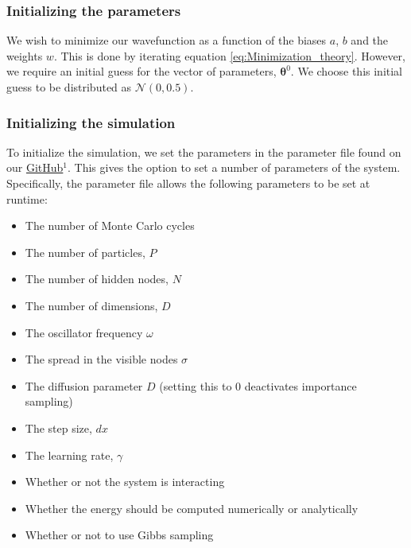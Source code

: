 \documentclass[a4paper, 10pt]{article}
\begin{document}
	\subsubsection{Initializing the parameters}
	We wish to minimize our wavefunction as a function of the biases $a$, $b$ and  the weights $w$. This is done by iterating equation \ref{eq:Minimization_theory}. However, we require an initial guess for the vector of parameters, $\boldsymbol{\theta}^0$. We choose this initial guess to be distributed as $\mathcal{N}(0, 0.5)$.
	\subsubsection{Initializing the simulation}
	To initialize the simulation, we set the parameters in the parameter file found on our \href{https://github.com/dulte/FYS4411/tree/master/Project2}{GitHub}$^1$. This gives the option to set a number of parameters of the system. Specifically, the parameter file allows the following parameters to be set at runtime:
	\begin{itemize}
	\item The number of Monte Carlo cycles
	\item The number of particles, $P$
	\item The number of hidden nodes, $N$
	\item The number of dimensions, $D$
	\item The oscillator frequency $\omega$
	\item The spread in the visible nodes $\sigma$
	\item The diffusion parameter $D$ (setting this to $0$ deactivates importance sampling)
	\item The step size, $dx$
	\item The learning rate, $\gamma$
	\item Whether or not the system is interacting
	\item Whether the energy should be computed numerically or analytically
	\item Whether or not to use Gibbs sampling
	\end{itemize}
\end{document}
